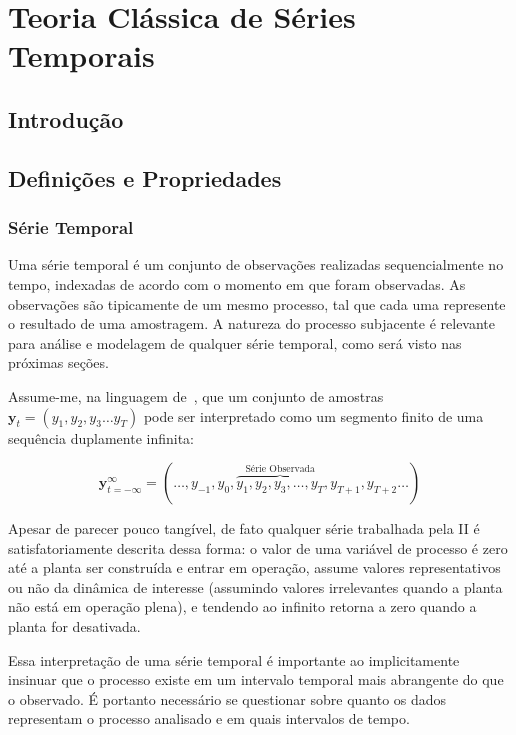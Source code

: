 \part{Teoria Clássica de Séries Temporais}
\label{cap:teorica_classica_series_temporais}


\chapter*{Introdução}
\label{sec:teorica_classica_series_temporais_introducao}

\chapter{Definições e Propriedades}
\label{sec:teorica_classica_series_temporais_definicoes}

\section{Série Temporal}\label{ssec:definition}

Uma série temporal é um conjunto de observações realizadas sequencialmente no
tempo, indexadas de acordo com o momento em que foram observadas. As observações
são tipicamente de um mesmo processo, tal que cada uma represente o resultado
de uma amostragem. A natureza do processo subjacente é relevante para análise e
modelagem de qualquer série temporal, como será visto nas próximas seções.

Assume-me, na linguagem de~\cite{hamilton}, que um conjunto de amostras
$\mathbf{y}_t = (y_1, y_2, y_3 \dots y_T)$ pode ser interpretado como um
segmento finito de uma sequência duplamente infinita:

$${\mathbf{y}}_{t=-\infty}^{\infty} = ({\dots, y_{-1},y_0, \overbrace{y_1, y_2, y_3, \dots, y_T}^{\text{Série Observada}}, y_{T+1}, y_{T+2}}\dots)$$

\vspace{1cm}

Apesar de parecer pouco tangível, de fato qualquer série trabalhada pela II
é satisfatoriamente descrita dessa forma: o valor de uma variável de processo
é zero até a planta ser construída e entrar em operação, assume valores
representativos ou não da dinâmica de interesse (assumindo valores irrelevantes
quando a planta não está em operação plena), e tendendo ao infinito retorna a
zero quando a planta for desativada.

Essa interpretação de uma série temporal é importante ao implicitamente
insinuar que o processo existe em um intervalo temporal mais abrangente do que
o observado. É portanto necessário se questionar sobre quanto os
dados representam o processo analisado e em quais intervalos de tempo.


